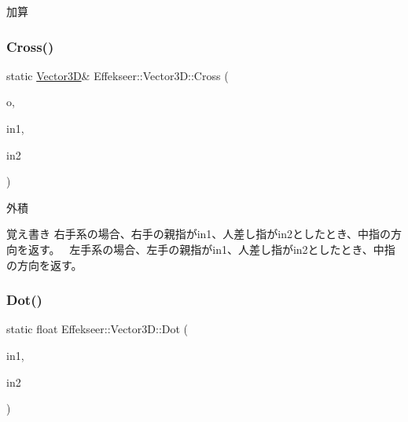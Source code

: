 加算 

\mbox{\label{struct_effekseer_1_1_vector3_d_a6af90fb7357d8ab977fd647f3bfd5c52}} 
\subsubsection{\texorpdfstring{Cross()}{Cross()}}
{\footnotesize\ttfamily static \mbox{\hyperlink{struct_effekseer_1_1_vector3_d}{Vector3D}}\& Effekseer\+::\+Vector3\+D\+::\+Cross (\begin{DoxyParamCaption}\item[{\mbox{\hyperlink{struct_effekseer_1_1_vector3_d}{Vector3D}} \&}]{o,  }\item[{const \mbox{\hyperlink{struct_effekseer_1_1_vector3_d}{Vector3D}} \&}]{in1,  }\item[{const \mbox{\hyperlink{struct_effekseer_1_1_vector3_d}{Vector3D}} \&}]{in2 }\end{DoxyParamCaption})\hspace{0.3cm}{\ttfamily [static]}}



外積 

\begin{DoxyNote}{覚え書き}
右手系の場合、右手の親指がin1、人差し指がin2としたとき、中指の方向を返す。~\newline
 左手系の場合、左手の親指がin1、人差し指がin2としたとき、中指の方向を返す。~\newline
 
\end{DoxyNote}
\mbox{\label{struct_effekseer_1_1_vector3_d_a793f67e8b72956924e0717d82b41e3ea}} 
\subsubsection{\texorpdfstring{Dot()}{Dot()}}
{\footnotesize\ttfamily static float Effekseer\+::\+Vector3\+D\+::\+Dot (\begin{DoxyParamCaption}\item[{const \mbox{\hyperlink{struct_effekseer_1_1_vector3_d}{Vector3D}} \&}]{in1,  }\item[{const \mbox{\hyperlink{struct_effekseer_1_1_vector3_d}{Vector3D}} \&}]{in2 }\end{DoxyParamCaption})\hspace{0.3cm}{\ttfamily [static]}}



